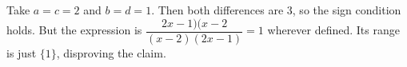 Take $a=c=2$ and $b=d=1$. Then both differences are 3, so the sign condition holds. But the expression is $\dfrac{2x-1) (x-2}{(x-2)(2x-1)} = 1$ wherever defined. Its range is just $\{1\}$, disproving the claim.
